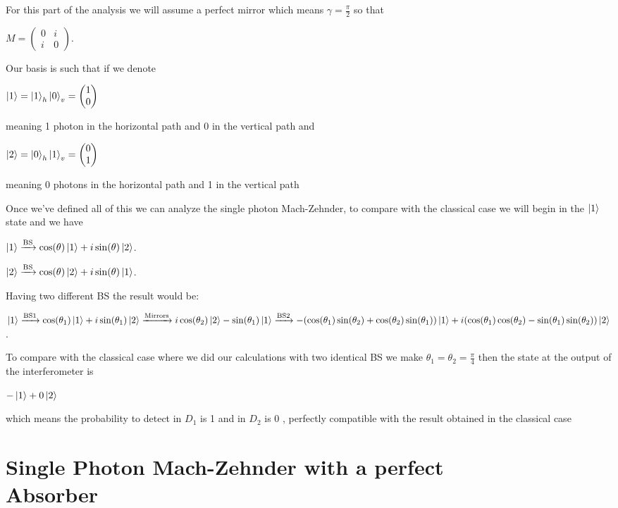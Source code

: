 \documentclass[11pt]{article}
\begin{document}
For this part of the analysis we will assume a perfect mirror which means $\gamma=\frac{\pi}{2}$ so that 

$M=\begin{pmatrix} 0& i \\ i & 0 \end{pmatrix}$.

Our basis is such that if we denote

 $\ket{1}=\ket{1}_{h}\ket{0}_{v}=\begin{pmatrix} 1 \\0\end{pmatrix}$ 

meaning 1 photon in the horizontal path and 0 in the vertical path and

 $\ket{2}=\ket{0}_{h}\ket{1}_{v}=\begin{pmatrix} 0 \\1 \end{pmatrix}$
 
meaning 0 photons in the horizontal path and 1 in the vertical path


Once we've defined all of this we can analyze the single photon Mach-Zehnder, to compare with the classical case we will begin in the $\ket{1}$ state and we have

$\ket{1}\xrightarrow{\text{BS}}\cos(\theta)\ket{1}+i\sin(\theta)\ket{2}$.

$\ket{2}\xrightarrow{\text{BS}}\cos(\theta)\ket{2}+i\sin(\theta)\ket{1}$.

Having two different BS the result would be:

$\ket{1}\xrightarrow{\text{BS1}}\cos(\theta_{1})\ket{1}+i\sin(\theta_{1})\ket{2}\xrightarrow{\text{Mirrors}}i\cos(\theta_{2})\ket{2}-\sin(\theta_{1})\ket{1}\xrightarrow{\text{BS2}}-(\cos(\theta_{1})\sin(\theta_{2})+\cos(\theta_{2})\sin(\theta_{1}))\ket{1}+i(\cos(\theta_{1})\cos(\theta_{2})-\sin(\theta_{1})\sin(\theta_{2}))\ket{2}$.

To compare with the classical case where we did our calculations with two identical BS we make $\theta_{1}=\theta_{2}=\frac{\pi}{4}$ then the state at the output of the interferometer is 

$-\ket{1}+0\ket{2}$

which means the probability to detect in $D_{1}$ is 1 and in $D_{2}$ is 0 , perfectly compatible with the result obtained in the classical case 


\section{Single Photon Mach-Zehnder with a perfect \\ Absorber}
\end{document}
